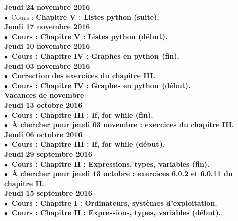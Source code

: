 \documentclass[12pt,a4paper]{article}
\begin{document}
\noindent\textbf{\bf Jeudi 24 novembre 2016 \rm}\\
$\bullet$\ Cours : \bf Chapitre V \rm : Listes python (suite).\vspace{.4cm}\\

\noindent\textbf{\bf Jeudi 17 novembre 2016 \rm}\\
$\bullet$\ Cours : \bf Chapitre V \rm : Listes python (début).\vspace{.4cm}\\

\noindent\textbf{\bf Jeudi 10 novembre 2016 \rm}\\
$\bullet$\ Cours : \bf Chapitre IV \rm : Graphes en python (fin).\vspace{.4cm}\\

\noindent\textbf{\bf Jeudi 03 novembre 2016 \rm}\\
$\bullet$\ Correction des exercices du chapitre III.\\
$\bullet$\ Cours : \bf Chapitre IV \rm : Graphes en python (début).\vspace{.4cm}\\

\noindent\textbf{ Vacances de novembre }\vspace{.4cm}\\

\noindent\textbf{\bf Jeudi 13 octobre 2016 \rm}\\
$\bullet$\ Cours : \bf Chapitre III \rm : If, for while (fin).\\
$\bullet$\ À chercher pour jeudi 03 novembre : exercices du chapitre III.\vspace{.4cm}\\
  
\noindent\textbf{\bf Jeudi 06 octobre 2016 \rm}\\
$\bullet$\ Cours : \bf Chapitre III \rm : If, for while (début).\vspace{.4cm}\\
  
\noindent\textbf{\bf Jeudi 29 septembre 2016 \rm}\\
$\bullet$\ Cours :  \bf Chapitre II \rm : Expressions, types, variables (fin).\\
$\bullet$\ À chercher pour jeudi 13 octobre : exercices 6.0.2 et 6.0.11 du chapitre 
II.\vspace{.4cm}\\

\noindent\textbf{\bf Jeudi 15 septembre 2016 \rm}\\
$\bullet$\ Cours :  \bf Chapitre I \rm : Ordinateurs, systèmes d'exploitation.\vspace{.4cm}\\
$\bullet$\ Cours :  \bf Chapitre II \rm : Expressions, types, variables (début).\vspace{.4cm}\\


\label{end}
\end{document}
